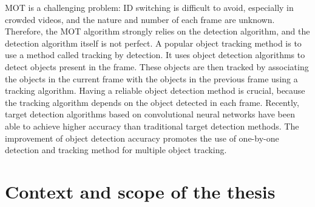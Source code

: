 MOT is a challenging problem: ID switching is difficult to avoid, especially in crowded videos, and the nature and number of each frame are unknown. Therefore, the MOT algorithm strongly relies on the detection algorithm, and the detection algorithm itself is not perfect. A popular object tracking method is to use a method called tracking by detection. It uses object detection algorithms to detect objects present in the frame. These objects are then tracked by associating the objects in the current frame with the objects in the previous frame using a tracking algorithm. Having a reliable object detection method is crucial, because the tracking algorithm depends on the object detected in each frame. Recently, target detection algorithms based on convolutional neural networks have been able to achieve higher accuracy than traditional target detection methods. The improvement of object detection accuracy promotes the use of one-by-one detection and tracking method for multiple object tracking.
\section{Context and scope of the thesis}
